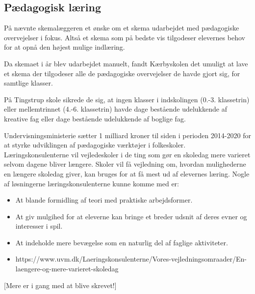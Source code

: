 \subsection{Pædagogisk læring}
\label{paedagogisk_laering}
På \school nævnte skemalæggeren et ønske om et skema udarbejdet med pædagogiske overvejelser i fokus. Altså et skema som på bedste vis tilgodeser elevernes behov for at opnå den højest mulige indlæring.

Da skemaet i år blev udarbejdet manuelt, fandt Kærbyskolen det umuligt at lave et skema der tilgodeser alle de pædagogiske overvejelser de havde gjort sig, for samtlige klasser\cite{interview_Kaerby}.

På Tingstrup skole sikrede de sig, at ingen klasser i indskolingen (0.-3. klassetrin) eller mellemtrinnet (4.-6. klassetrin) havde dage bestående udelukkende af kreative fag eller dage bestående udelukkende af boglige fag. 

Undervisningsministerie sætter 1 milliard kroner til siden i perioden 2014-2020 for at styrke udviklingen af pædagogiske værktøjer i folkeskoler. Læringskonsulenterne vil vejledeskoler i de ting som gør en skoledag mere varieret selvom dagene bliver længere. Skoler vil få vejledning om, hvordan mulighederne en længere skoledag giver, kan bruges for at få mest ud af elevernes læring. Nogle af løsningerne læringskonsulenterne kunne komme med er:
\begin{itemize}
\item At blande formidling af teori med praktiske arbejdsformer.
\item At giv mulgihed for at eleverne kan bringe et breder udsnit af deres evner og interesser i spil.
\item At indeholde mere bevægelse som en naturlig del af faglige aktiviteter.
\item https://www.uvm.dk/Laeringskonsulenterne/Vores-vejledningsomraader/En-laengere-og-mere-varieret-skoledag
\end{itemize}

[Mere er i gang med at blive skrevet!]